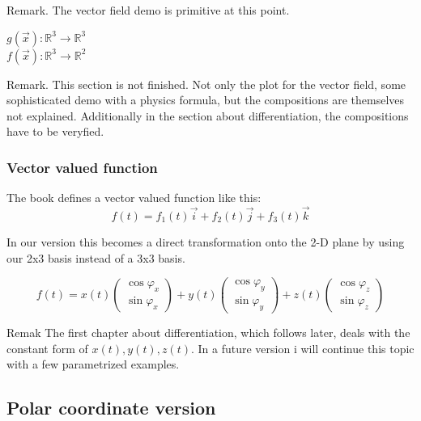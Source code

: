 \documentclass[a4paper]{article}
\begin{document}
\begin{Example}
Remark. The vector field demo is primitive at this point.

\begin{center}
$g(\vec{x}) : \mathbb{R}^{3} \rightarrow \mathbb{R}^{3}$\\
$f(\vec{x}) : \mathbb{R}^{3} \rightarrow \mathbb{R}^{2}$\\
\end{center}


Remark. This section is not finished. Not only the plot for the vector field, some sophisticated demo with a physics formula, but the compositions are themselves not explained. Additionally in the section about differentiation, the compositions have to be veryfied.\\

\subsubsection{Vector valued function}
\label{vector_valued_func}

The book \cite{Corral1} defines a vector valued function like this:
\begin{displaymath}
f(t) = f_{1}(t)\vec{i}+f_{2}(t)\vec{j}+f_{3}(t)\vec{k}
\end{displaymath}

In our version this becomes a direct transformation onto the 2-D plane by using our 2x3 basis instead of a 3x3 basis.

\begin{displaymath}
f(t) = x(t)\begin{pmatrix}\cos\varphi_x\\\sin\varphi_x\end{pmatrix}
        +y(t)\begin{pmatrix}\cos\varphi_y\\\sin\varphi_y\end{pmatrix}
        +z(t)\begin{pmatrix}\cos\varphi_z\\\sin\varphi_z\end{pmatrix}
\end{displaymath}

Remak The first chapter about differentiation, which follows later, deals with the constant form of $x(t), y(t), z(t)$. In a future version i will continue this topic with a few parametrized examples.\\

\subsection{Polar coordinate version}
\label{polar_coord_func}


\end{Example}
\end{document}

